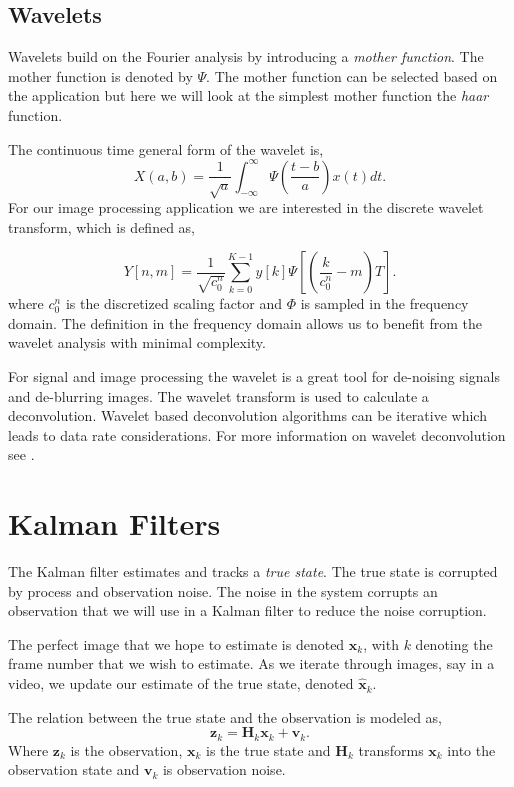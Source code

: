 \subsection{Wavelets}

Wavelets build on the Fourier analysis by introducing a \emph{mother function}. The mother function is denoted by $\Psi$. The mother function can be selected based on the application but here we will look at the simplest mother function the \emph{haar} function.

The continuous time general form of the wavelet is,
\begin{equation}
X(a,b) = \frac{1}{\sqrt{a}}\int_{-\infty}^{\infty}\Psi\left(\frac{t-b}{a}\right) x(t)dt.
\end{equation}
\noindent
For our image processing application we are interested in the discrete wavelet transform, which is defined as,

\begin{equation}
Y[n,m] = \frac{1}{\sqrt{c_0^n}}\sum_{k=0}^{K-1}y[k]\Psi\left[\left(\frac{k}{c_0^n}-m\right)T\right].
\end{equation}
\noindent
where $c_0^n$ is the discretized scaling factor and $\Phi$ is sampled in the frequency domain. The definition in the frequency domain allows us to benefit from the wavelet analysis with minimal complexity. 

For signal and image processing the wavelet is a great tool for de-noising signals and de-blurring images. The wavelet transform is used to calculate a deconvolution. Wavelet based deconvolution algorithms can be iterative which leads to data rate considerations. For more information on wavelet deconvolution see \cite{welstead1999fractal}.

\section{Kalman Filters}

The Kalman filter estimates and tracks a \emph{true state}. The true state is corrupted by process and observation noise. The noise in the system corrupts an observation that we will use in a Kalman filter to reduce the noise corruption. 

The perfect image that we hope to estimate is denoted $\mathbf{x}_k$, with $k$ denoting the frame number that we wish to estimate. As we iterate through images, say in a video, we update our estimate of the true state, denoted $\hat{\mathbf{x}}_k$.

The relation between the true state and the observation is modeled as,
\begin{equation}
\mathbf{z}_k = \mathbf{H}_k\mathbf{x}_{k} + \mathbf{v}_k.
\end{equation}
\noindent 
Where $\mathbf{z}_k$ is the observation, $\mathbf{x}_k$ is the true state and $\mathbf{H}_k$ transforms $\mathbf{x}_k$ into the observation state and $\mathbf{v}_k$ is observation noise. 

